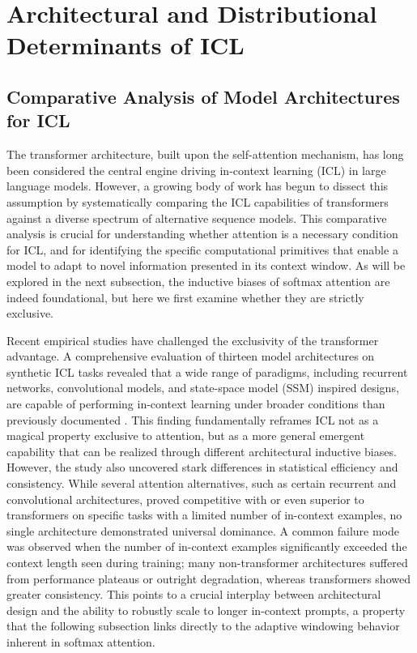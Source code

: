 \documentclass[11pt]{article}
\begin{document}
\section{Architectural and Distributional Determinants of ICL}

\subsection{Comparative Analysis of Model Architectures for ICL}

The transformer architecture, built upon the self-attention mechanism, has long been considered the central engine driving in-context learning (ICL) in large language models. However, a growing body of work has begun to dissect this assumption by systematically comparing the ICL capabilities of transformers against a diverse spectrum of alternative sequence models. This comparative analysis is crucial for understanding whether attention is a necessary condition for ICL, and for identifying the specific computational primitives that enable a model to adapt to novel information presented in its context window. As will be explored in the next subsection, the inductive biases of softmax attention are indeed foundational, but here we first examine whether they are strictly exclusive.

Recent empirical studies have challenged the exclusivity of the transformer advantage. A comprehensive evaluation of thirteen model architectures on synthetic ICL tasks revealed that a wide range of paradigms, including recurrent networks, convolutional models, and state-space model (SSM) inspired designs, are capable of performing in-context learning under broader conditions than previously documented \cite{ref86}. This finding fundamentally reframes ICL not as a magical property exclusive to attention, but as a more general emergent capability that can be realized through different architectural inductive biases. However, the study also uncovered stark differences in statistical efficiency and consistency. While several attention alternatives, such as certain recurrent and convolutional architectures, proved competitive with or even superior to transformers on specific tasks with a limited number of in-context examples, no single architecture demonstrated universal dominance. A common failure mode was observed when the number of in-context examples significantly exceeded the context length seen during training; many non-transformer architectures suffered from performance plateaus or outright degradation, whereas transformers showed greater consistency. This points to a crucial interplay between architectural design and the ability to robustly scale to longer in-context prompts, a property that the following subsection links directly to the adaptive windowing behavior inherent in softmax attention.
\end{document}
